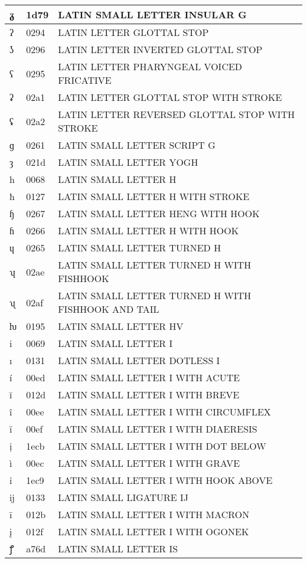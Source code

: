 \documentclass[12pt,letterpaper,openany]{book}
\begin{document}
\begin{center}
\begin{supertabular}{|m{0.25in}|m{0.5in}|m{4in}|}
ᵹ & 1d79 & LATIN SMALL LETTER INSULAR G\\\hline
ʔ & 0294 & LATIN LETTER GLOTTAL STOP\\\hline
ʖ & 0296 & LATIN LETTER INVERTED GLOTTAL STOP\\\hline
ʕ & 0295 & LATIN LETTER PHARYNGEAL VOICED FRICATIVE\\\hline
ʡ & 02a1 & LATIN LETTER GLOTTAL STOP WITH STROKE\\\hline
ʢ & 02a2 & LATIN LETTER REVERSED GLOTTAL STOP WITH STROKE\\\hline
ɡ & 0261 & LATIN SMALL LETTER SCRIPT G\\\hline
ȝ & 021d & LATIN SMALL LETTER YOGH\\\hline
h & 0068 & LATIN SMALL LETTER H\\\hline
ħ & 0127 & LATIN SMALL LETTER H WITH STROKE\\\hline
ɧ & 0267 & LATIN SMALL LETTER HENG WITH HOOK\\\hline
ɦ & 0266 & LATIN SMALL LETTER H WITH HOOK\\\hline
ɥ & 0265 & LATIN SMALL LETTER TURNED H\\\hline
ʮ & 02ae & LATIN SMALL LETTER TURNED H WITH FISHHOOK\\\hline
ʯ & 02af & \scriptsize LATIN SMALL LETTER TURNED H WITH FISHHOOK AND TAIL\\\hline
ƕ & 0195 & LATIN SMALL LETTER HV\\\hline
i & 0069 & LATIN SMALL LETTER I\\\hline
ı & 0131 & LATIN SMALL LETTER DOTLESS I\\\hline
í & 00ed & LATIN SMALL LETTER I WITH ACUTE\\\hline
ĭ & 012d & LATIN SMALL LETTER I WITH BREVE\\\hline
î & 00ee & LATIN SMALL LETTER I WITH CIRCUMFLEX\\\hline
ï & 00ef & LATIN SMALL LETTER I WITH DIAERESIS\\\hline
ị & 1ecb & LATIN SMALL LETTER I WITH DOT BELOW\\\hline
ì & 00ec & LATIN SMALL LETTER I WITH GRAVE\\\hline
ỉ & 1ec9 & LATIN SMALL LETTER I WITH HOOK ABOVE\\\hline
ĳ & 0133 & LATIN SMALL LIGATURE IJ\\\hline
ī & 012b & LATIN SMALL LETTER I WITH MACRON\\\hline
į & 012f & LATIN SMALL LETTER I WITH OGONEK\\\hline
ꝭ & a76d & LATIN SMALL LETTER IS\\\hline

\end{supertabular}
\end{center}
\end{document}
